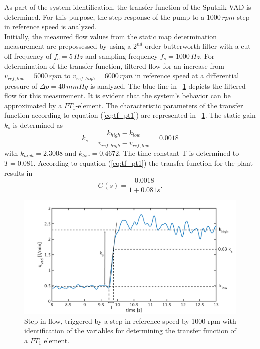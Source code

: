 As part of the system identification, the transfer function of the Sputnik VAD is determined. For this purpose, the step response of the pump to a $1000\,rpm$ step in reference speed is analyzed.
\\Initially, the measured flow values from the static map determination measurement are prepossessed by using a $2^{nd}$-order butterworth filter with a cut-off frequency of $f_c = 5\,Hz$ and sampling frequency $f_s=1000 \, Hz$. For determination of the transfer function, filtered flow for an increase from $v_{ref,low}=5000\,rpm$ to $v_{ref,high}=6000\,rpm$ in reference speed at a differential pressure of $\Delta{p}=40\,mmHg$ is analyzed. The blue line in \figurename~\ref{fig:plant} depicts the filtered flow for this measurement. It is evident that the system's behavior can be approximated by a $PT_1$-element.
 The characteristic parameters of the transfer function according to equation (\ref{eq:tf_pt1}) are represented in \figurename~\ref{fig:plant}. The static gain $k_s$ is determined as
\begin{equation}
  k_s = \frac{k_{high}-k_{low}}{v_{ref,high}-v_{ref,low}}=0.0018
\label{eq:k_s_1}
\end{equation}
with $k_{high}=2.3008$ and $k_{low}=0.4672$. The time constant T is determined to $T=0.081$.
According to equation (\ref{eq:tf_pt1}) the transfer function for the plant results in
\begin{equation}
    G(s) = \frac{0.0018}{1+0.081s}.
 \label{eq:plant}
\end{equation}
\begin{figure}[t]
  \centering
  \includegraphics[width=\textwidth]{images/chapt_4/plant_generation.pdf}
  \caption[Transfer function of Sputnik VAD]{Step in flow, triggered by a step in reference speed by 1000 rpm with identification of the variables for determining the transfer function of a $PT_1$ element.}
  \label{fig:plant}
\end{figure}
